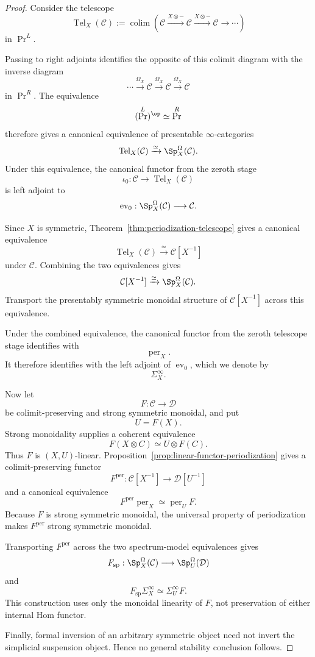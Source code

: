 \begin{proof}
Consider the telescope
\[
    \operatorname{Tel}_X(\mathcal C)
    :=
    \operatorname*{colim}
    \left(
      \mathcal C
      \xrightarrow{X\otimes-}
      \mathcal C
      \xrightarrow{X\otimes-}
      \mathcal C
      \longrightarrow\cdots
    \right)
\]
in \(\Pr^L\).

Passing to right adjoints identifies the opposite of this colimit diagram
with the inverse diagram
\[
    \cdots
    \xrightarrow{\Omega_X}
    \mathcal C
    \xrightarrow{\Omega_X}
    \mathcal C
    \xrightarrow{\Omega_X}
    \mathcal C
\]
in \(\Pr^R\).  The equivalence
\[
    (\Pr^L)^{\op}
    \simeq
    \Pr^R
\]
therefore gives a canonical equivalence of presentable
\(\infty\)-categories
\[
    \operatorname{Tel}_X(\mathcal C)
    \xrightarrow{\simeq}
    \Sp_X^\Omega(\mathcal C).
\]
Under this equivalence, the canonical functor from the zeroth stage
\[
    \iota_0:
    \mathcal C
    \longrightarrow
    \operatorname{Tel}_X(\mathcal C)
\]
is left adjoint to
\[
    \operatorname{ev}_0:
    \Sp_X^\Omega(\mathcal C)
    \longrightarrow
    \mathcal C.
\]

Since \(X\) is symmetric,
Theorem~\ref{thm:periodization-telescope} gives a canonical equivalence
\[
    \operatorname{Tel}_X(\mathcal C)
    \xrightarrow{\simeq}
    \mathcal C[X^{-1}]
\]
under \(\mathcal C\).  Combining the two equivalences gives
\[
    \mathcal C[X^{-1}]
    \xrightarrow{\simeq}
    \Sp_X^\Omega(\mathcal C).
\]
Transport the presentably symmetric monoidal structure of
\(\mathcal C[X^{-1}]\) across this equivalence.

Under the combined equivalence, the canonical functor from the zeroth
telescope stage identifies with
\[
    \operatorname{per}_X.
\]
It therefore identifies with the left adjoint of
\(\operatorname{ev}_0\), which we denote by
\[
    \Sigma_X^\infty.
\]

Now let
\[
    F:
    \mathcal C
    \longrightarrow
    \mathcal D
\]
be colimit-preserving and strong symmetric monoidal, and put
\[
    U=F(X).
\]
Strong monoidality supplies a coherent equivalence
\[
    F(X\otimes C)
    \simeq
    U\otimes F(C).
\]
Thus \(F\) is \((X,U)\)-linear.
Proposition~\ref{prop:linear-functor-periodization} gives a
colimit-preserving functor
\[
    F^{\mathrm{per}}:
    \mathcal C[X^{-1}]
    \longrightarrow
    \mathcal D[U^{-1}]
\]
and a canonical equivalence
\[
    F^{\mathrm{per}}\operatorname{per}_X
    \simeq
    \operatorname{per}_U F.
\]
Because \(F\) is strong symmetric monoidal, the universal property of
periodization makes \(F^{\mathrm{per}}\) strong symmetric monoidal.

Transporting \(F^{\mathrm{per}}\) across the two spectrum-model
equivalences gives
\[
    F_{\mathrm{sp}}:
    \Sp_X^\Omega(\mathcal C)
    \longrightarrow
    \Sp_U^\Omega(\mathcal D)
\]
and
\[
    F_{\mathrm{sp}}\Sigma_X^\infty
    \simeq
    \Sigma_U^\infty F.
\]
This construction uses only the monoidal linearity of \(F\), not
preservation of either internal Hom functor.

Finally, formal inversion of an arbitrary symmetric object need not invert
the simplicial suspension object.  Hence no general stability conclusion
follows.
\end{proof}

